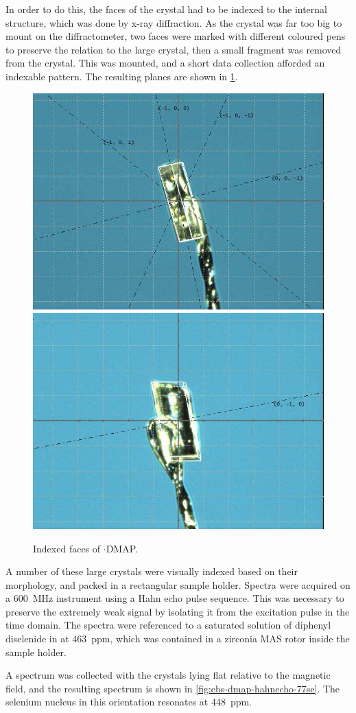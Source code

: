\begin{refsection}
In order to do this, the faces of the crystal had to be indexed to the internal structure, which was done by x-ray diffraction.
As the crystal was far too big to mount on the diffractometer, two faces were marked with different coloured pens to preserve the relation to the large crystal, then a small fragment was removed from the crystal.
This was mounted, and a short data collection afforded an indexable pattern.
The resulting planes are shown in \cref{fig:ebs-ph-dmap-index}.

\begin{figure}
  \centering
  \includegraphics[width=0.48\linewidth]{Figures/xtal-b.jpg}
  \includegraphics[width=0.48\linewidth]{Figures/xtal-c.jpg}
  \caption{Indexed faces of $ \cdot $DMAP.}\label{fig:ebs-ph-dmap-index}
\end{figure}

A number of these large crystals were visually indexed based on their morphology, and packed in a rectangular sample holder.
Spectra were acquired on a 600~MHz instrument using a Hahn echo pulse sequence.
This was necessary to preserve the extremely weak signal by isolating it from the excitation pulse in the time domain.
The spectra were referenced to a saturated solution of diphenyl diselenide in  at 463~ppm, which was contained in a zirconia MAS rotor inside the sample holder.\autocite{Duddeck1995}

A spectrum was collected with the crystals lying flat relative to the magnetic field, and the resulting spectrum is shown in \cref{fig:ebs-dmap-hahnecho-77se}.
The selenium nucleus in this orientation resonates at 448~ppm.


\end{refsection}
